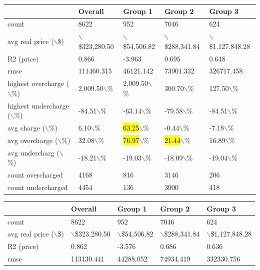 \documentclass{article}
\begin{document}
\begin{table}[!ht]
    \centering
    \begin{tabular}{|l|l|l|l|l|}
    \hline
        ~ & Overall & Group 1 & Group 2 & Group 3 \\ \hline
        count & 8622 & 952 & 7046 & 624 \\ \hline
        avg real price ($\backslash$\$) & $\backslash$\$323,280.50 & $\backslash$\$54,506.82 & $\backslash$\$288,341.84 & $\backslash$\$1,127,848.28 \\ \hline
        R2 (price) & 0.866 & -3.963 & 0.695 & 0.648 \\ \hline
        rmse & 111460.315 & 46121.142 & 73901.332 & 326717.458 \\ \hline
        highest overcharge ($\backslash$\%) & 2,009.50$\backslash$\% & 2,009.50$\backslash$\% & 300.70$\backslash$\% & 127.50$\backslash$\% \\ \hline
        highest undercharge ($\backslash$\%) & -84.51$\backslash$\% & -63.14$\backslash$\% & -79.58$\backslash$\% & -84.51$\backslash$\% \\ \hline
        avg charge ($\backslash$\%) & 6.10$\backslash$\% & \hl{63.25}$\backslash$\% & -0.44$\backslash$\% & -7.18$\backslash$\% \\ \hline
        avg overcharge ($\backslash$\%) & 32.08$\backslash$\% & \hl{76.97}$\backslash$\% & \hl{21.44}$\backslash$\% & 16.89$\backslash$\% \\ \hline
        avg undercharg ($\backslash$\%) & -18.21$\backslash$\% & -19.03$\backslash$\% & -18.09$\backslash$\% & -19.04$\backslash$\% \\ \hline
        count overcharged & 4168 & 816 & 3146 & 206 \\ \hline
        count undercharged & 4454 & 136 & 3900 & 418 \\ \hline
    \end{tabular}
\begin{tabular}{|l|l|l|l|l|}
    \hline
        ~ & Overall & Group 1 & Group 2 & Group 3 \\ \hline
        count & 8622 & 952 & 7046 & 624 \\ \hline
        avg real price ($\backslash$\$) & $\backslash$\$323,280.50 & $\backslash$\$54,506.82 & $\backslash$\$288,341.84 & $\backslash$\$1,127,848.28 \\ \hline
        R2 (price) & 0.862 & -3.576 & 0.686 & 0.636 \\ \hline
        rmse & 113130.441 & 44288.052 & 74934.419 & 332330.756 \\ \hline

\end{tabular}
\end{table}
\end{document}
